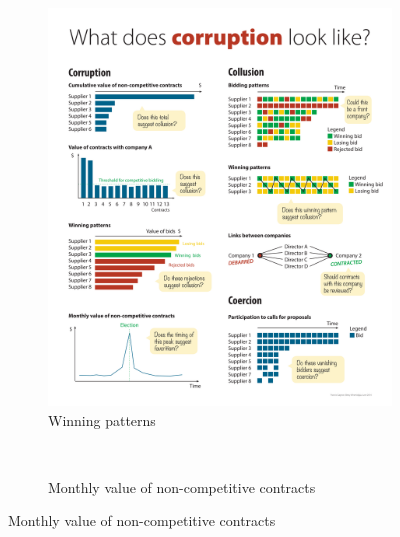 \begin{figure}[H]
\begin{subfigure}[t]{0.5\textwidth}
\end{subfigure}
~
\begin{subfigure}[t]{0.5\textwidth}
\caption{Winning patterns}
\label{fig_winning}
\includegraphics[max width=1\textwidth]{../img/poster_winning_patterns.pdf}
\end{subfigure}
~
\begin{subfigure}[t]{0.5\textwidth}
\caption{Monthly value of non-competitive contracts}
\label{fig_month}

\end{subfigure}
\end{figure}
